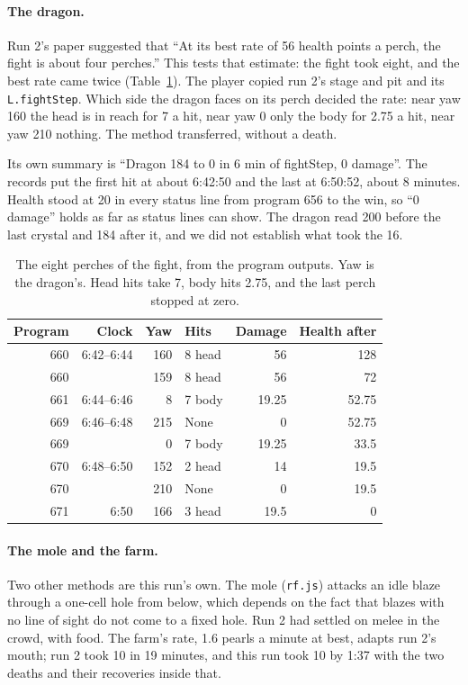 \documentclass[11pt,a4paper]{article}
\begin{document}
\paragraph{The dragon.} Run 2's paper suggested that ``At its best rate of 56 health points a perch, the fight is about four perches.'' This tests that estimate: the fight took eight, and the best rate came twice (Table~\ref{tab:perches}). The player copied run 2's stage and pit and its \texttt{L.fightStep}. Which side the dragon faces on its perch decided the rate: near yaw 160 the head is in reach for 7 a hit, near yaw 0 only the body for 2.75 a hit, near yaw 210 nothing. The method transferred, without a death.

Its own summary is ``Dragon 184 to 0 in 6 min of fightStep, 0 damage''. The records put the first hit at about 6:42:50 and the last at 6:50:52, about 8 minutes. Health stood at 20 in every status line from program 656 to the win, so ``0 damage'' holds as far as status lines can show. The dragon read 200 before the last crystal and 184 after it, and we did not establish what took the 16.

\begin{table}[t]
  \caption{The eight perches of the fight, from the program outputs. Yaw is the dragon's. Head hits take 7, body hits 2.75, and the last perch stopped at zero.}
  \label{tab:perches}
  \small
  \begin{tabular*}{\textwidth}{@{\extracolsep{\fill}}rrrlrr@{}}
    \toprule
    \textbf{Program} & \textbf{Clock} & \textbf{Yaw} & \textbf{Hits} & \textbf{Damage} & \textbf{Health after} \\
    \midrule
    660 & 6:42--6:44 & 160 & 8 head & 56 & 128 \\
    660 & & 159 & 8 head & 56 & 72 \\
    661 & 6:44--6:46 & 8 & 7 body & 19.25 & 52.75 \\
    669 & 6:46--6:48 & 215 & None & 0 & 52.75 \\
    669 & & 0 & 7 body & 19.25 & 33.5 \\
    670 & 6:48--6:50 & 152 & 2 head & 14 & 19.5 \\
    670 & & 210 & None & 0 & 19.5 \\
    671 & 6:50 & 166 & 3 head & 19.5 & 0 \\
    \bottomrule
  \end{tabular*}
\end{table}

\paragraph{The mole and the farm.} Two other methods are this run's own. The mole (\texttt{rf.js}) attacks an idle blaze through a one-cell hole from below, which depends on the fact that blazes with no line of sight do not come to a fixed hole. Run 2 had settled on melee in the crowd, with food. The farm's rate, 1.6 pearls a minute at best, adapts run 2's mouth; run 2 took 10 in 19 minutes, and this run took 10 by 1:37 with the two deaths and their recoveries inside that.
\end{document}
